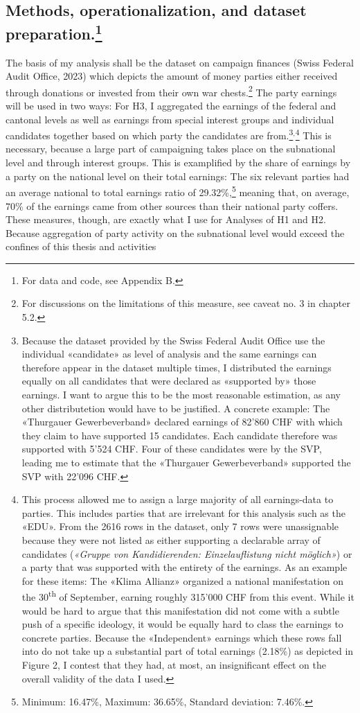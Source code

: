 \documentclass[11pt,a4paper]{article}
\begin{document}
\subsection{Methods, operationalization, and dataset preparation.\footnote{ For data and code, see Appendix B.}}
The basis of my analysis shall be the dataset on campaign finances (Swiss Federal Audit Office, 2023) which depicts the amount of money parties either received through donations or invested from their own war chests.\footnote{For discussions on the limitations of this measure, see caveat no. 3 in chapter 5.2.} The party earnings will be used in two ways: For H3, I aggregated the earnings of the federal and cantonal levels as well as earnings from special interest groups and individual candidates together based on which party the candidates are from.\footnote{Because the dataset provided by the Swiss Federal Audit Office use the individual «candidate» as level of analysis and the same earnings can therefore appear in the dataset multiple times, I distributed the earnings equally on all candidates that were declared as «supported by» those earnings. I want to argue this to be the most reasonable estimation, as any other distributetion would have to be justified. A concrete example: The «Thurgauer Gewerbeverband» declared earnings of 82’860 CHF with which they claim to have supported 15 candidates. Each candidate therefore was supported with 5’524 CHF. Four of these candidates were by the SVP, leading me to estimate that the «Thurgauer Gewerbeverband» supported the SVP with 22’096 CHF.}$^{, }$\footnote{This process allowed me to assign a large majority of all earnings-data to parties. This includes parties that are irrelevant for this analysis such as the «EDU». From the 2616 rows in the dataset, only 7 rows were unassignable because they were not listed as either supporting a declarable array of candidates (\textit{«Gruppe von Kandidierenden: Einzelauflistung nicht möglich»}) or a party that was supported with the entirety of the earnings. As an example for these items: The «Klima Allianz» organized a national manifestation on the 30\textsuperscript{th} of September, earning roughly 315’000 CHF from this event. While it would be hard to argue that this manifestation did not come with a subtle push of a specific ideology, it would be equally hard to class the earnings to concrete parties. Because the «Independent» earnings which these rows fall into do not take up a substantial part of total earnings (2.18\%) as depicted in Figure 2, I contest that they had, at most, an insignificant effect on the overall validity of the data I used.} This is necessary, because a large part of campaigning takes place on the subnational level and through interest groups. This is examplified by the share of earnings by a party on the national level on their total earnings: The six relevant parties had an average national to total earnings ratio of 29.32\%,\footnote{ Minimum: 16.47\%, Maximum: 36.65\%, Standard deviation: 7.46\%.} meaning that, on average, 70\% of the earnings came from other sources than their national party coffers. These measures, though, are exactly what I use for Analyses of H1 and H2. Because aggregation of party activity on the subnational level would exceed the confines of this thesis and activities 
\end{document}
